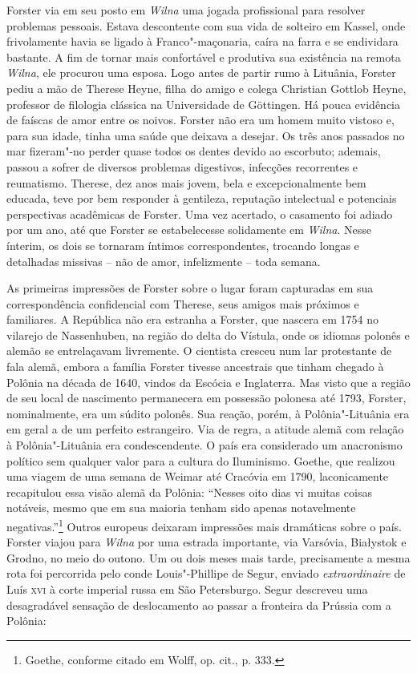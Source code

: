 Forster via em seu posto em \textit{Wilna} uma jogada profissional para resolver
problemas pessoais. Estava descontente com sua vida de solteiro em
Kassel, onde frivolamente havia se ligado à Franco"-maçonaria, caíra na
farra e se endividara bastante. A fim de tornar mais confortável e
produtiva sua existência na remota \textit{Wilna}, ele procurou uma esposa. Logo
antes de partir rumo à Lituânia, Forster pediu a mão de Therese Heyne,
filha do amigo e colega Christian Gottlob Heyne, professor de filologia
clássica na Universidade de Göttingen. Há pouca evidência de faíscas de
amor entre os noivos. Forster não era um homem muito vistoso e, para sua
idade, tinha uma saúde que deixava a desejar. Os três anos passados no
mar fizeram"-no perder quase todos os dentes devido ao escorbuto;
ademais, passou a sofrer de diversos problemas digestivos, infecções
recorrentes e reumatismo. Therese, dez anos mais jovem, bela e
excepcionalmente bem educada, teve por bem responder à gentileza,
reputação intelectual e potenciais perspectivas acadêmicas de Forster.
Uma vez acertado, o casamento foi adiado por um ano, até que Forster se
estabelecesse solidamente em \textit{Wilna}. Nesse ínterim, os dois se tornaram
íntimos correspondentes, trocando longas e detalhadas missivas -- não de
amor, infelizmente -- toda semana.

As primeiras impressões de Forster sobre o lugar foram capturadas em sua
correspondência confidencial com Therese, seus amigos mais próximos e
familiares. A República não era estranha a Forster, que nascera em 1754
no vilarejo de Nassenhuben, na região do delta do Vístula, onde os
idiomas polonês e alemão se entrelaçavam livremente. O cientista cresceu
num lar protestante de fala alemã, embora a família Forster tivesse
ancestrais que tinham chegado à Polônia na década de 1640, vindos da
Escócia e Inglaterra. Mas visto que a região de seu local de nascimento
permanecera em possessão polonesa até 1793, Forster, nominalmente, era
um súdito polonês. Sua reação, porém, à Polônia"-Lituânia era em geral a
de um perfeito estrangeiro. Via de regra, a atitude alemã com relação à
Polônia"-Lituânia era condescendente. O país era considerado um
anacronismo político sem qualquer valor para a cultura do Iluminismo.
Goethe, que realizou uma viagem de uma semana de Weimar até Cracóvia em
1790, laconicamente recapitulou essa visão alemã da Polônia: ``Nesses
oito dias vi muitas coisas notáveis, mesmo que em sua maioria tenham
sido apenas notavelmente negativas.''\footnote{Goethe, conforme citado em Wolff, op. cit., p. 333.}
Outros europeus deixaram impressões mais dramáticas sobre o país.
Forster viajou para \textit{Wilna} por uma estrada importante, via Varsóvia,
Białystok e Grodno, no meio do outono. Um ou dois meses mais tarde,
precisamente a mesma rota foi percorrida pelo conde Louis"-Phillipe de
Segur, enviado \textit{extraordinaire} de Luís \textsc{xvi} à corte imperial russa
em São Petersburgo. Segur descreveu uma desagradável sensação de
deslocamento ao passar a fronteira da Prússia com a Polônia:

